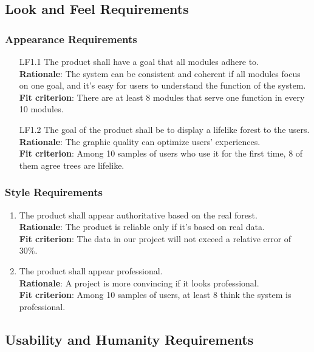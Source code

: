 \documentclass{article}
\begin{document}
\subsection{Look and Feel Requirements}
\subsubsection{Appearance Requirements}
\begin{enumerate}
    \item[LF1.1] The product shall have a goal that all modules adhere to.\\
    \textbf{Rationale}: The system can be consistent and coherent if all modules focus on one goal, and it's easy for users to understand the function of the system.\\
    \textbf{Fit criterion}:  There are at least 8 modules that serve one function in every 10 modules.
   
    \item[LF1.2] The goal of the product shall be to display a lifelike forest to the users.\\
    \textbf{Rationale}: The graphic quality can optimize users' experiences.\\
    \textbf{Fit criterion}: Among 10 samples of users who use it for the first time, 8 of them agree trees are lifelike.
\end{enumerate}
\subsubsection{Style Requirements}
\begin{enumerate}[LF2.1]
    \item The product shall appear authoritative based on the real forest.\\
    \textbf{Rationale}: The product is reliable only if it's based on real data.\\
    \textbf{Fit criterion}: The data in our project will not exceed a relative error of 30\%.
    
    \item The product shall appear professional.\\
    \textbf{Rationale}: A project is more convincing if it looks professional.\\
    \textbf{Fit criterion}: Among 10 samples of users, at least 8 think the system is professional.
\end{enumerate}
\subsection{Usability and Humanity Requirements}
\end{document}
